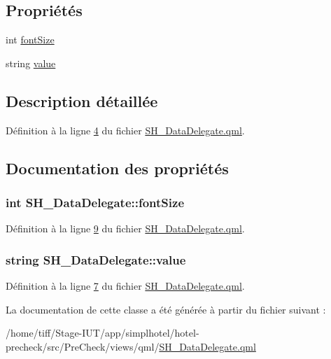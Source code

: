 \subsection*{Propriétés}
\begin{DoxyCompactItemize}
\item 
int \hyperlink{classSH__DataDelegate_afbb41ad9b513c7f27e7b5ad90d82e95b}{font\-Size}
\item 
string \hyperlink{classSH__DataDelegate_acb9da3c73493c88865e08d9575f26482}{value}
\end{DoxyCompactItemize}


\subsection{Description détaillée}


Définition à la ligne \hyperlink{SH__DataDelegate_8qml_source_l00004}{4} du fichier \hyperlink{SH__DataDelegate_8qml_source}{S\-H\-\_\-\-Data\-Delegate.\-qml}.



\subsection{Documentation des propriétés}
\hypertarget{classSH__DataDelegate_afbb41ad9b513c7f27e7b5ad90d82e95b}{
\subsubsection[{font\-Size}]{\setlength{\rightskip}{0pt plus 5cm}int S\-H\-\_\-\-Data\-Delegate\-::font\-Size}}\label{classSH__DataDelegate_afbb41ad9b513c7f27e7b5ad90d82e95b}


Définition à la ligne \hyperlink{SH__DataDelegate_8qml_source_l00009}{9} du fichier \hyperlink{SH__DataDelegate_8qml_source}{S\-H\-\_\-\-Data\-Delegate.\-qml}.

\hypertarget{classSH__DataDelegate_acb9da3c73493c88865e08d9575f26482}{
\subsubsection[{value}]{\setlength{\rightskip}{0pt plus 5cm}string S\-H\-\_\-\-Data\-Delegate\-::value}}\label{classSH__DataDelegate_acb9da3c73493c88865e08d9575f26482}


Définition à la ligne \hyperlink{SH__DataDelegate_8qml_source_l00007}{7} du fichier \hyperlink{SH__DataDelegate_8qml_source}{S\-H\-\_\-\-Data\-Delegate.\-qml}.



La documentation de cette classe a été générée à partir du fichier suivant \-:\begin{DoxyCompactItemize}
\item 
/home/tiff/\-Stage-\/\-I\-U\-T/app/simplhotel/hotel-\/precheck/src/\-Pre\-Check/views/qml/\hyperlink{SH__DataDelegate_8qml}{S\-H\-\_\-\-Data\-Delegate.\-qml}\end{DoxyCompactItemize}
